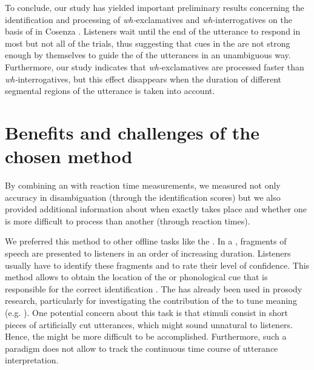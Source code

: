 \documentclass[output=paper]{langsci/langscibook}
\begin{document}
To conclude, our study has yielded important preliminary results concerning the identification and processing of \textit{wh-}exclamatives and \textit{wh-}interrogatives on the basis of  in Cosenza . Listeners wait until the end of the utterance to respond in most but not all of the trials, thus suggesting that  cues in the  are not strong enough by themselves to guide the  of the utterances in an unambiguous way. Furthermore, our study indicates that \textit{wh-}exclamatives are processed faster than \textit{wh-}interrogatives, but this effect disappears when the duration of different segmental regions of the utterance is taken into account.

\section{Benefits and challenges of the chosen method}
\label{sec:kel:7}

By combining an  with reaction time measurements, we measured not only accuracy in  disambiguation (through the identification scores) but we also provided additional information about when exactly  takes place and whether one  is more difficult to process than another (through reaction times).

We preferred this method to other offline tasks like the . In a , fragments of speech are presented to listeners in an order of increasing duration. Listeners usually have to identify these fragments and to rate their level of confidence. This method allows to obtain the location of the  or phonological cue that is responsible for the correct identification \citep{Prieto.2012}. The  has already been used in prosody research, particularly for investigating the contribution of the  to tune meaning (e.g. \citealt{Petrone2008,Petrone.2011,Sorianello2012,Prieto.2012}). One potential concern about this task is that stimuli consist in short pieces of artificially cut utterances, which might sound unnatural to listeners. Hence, the  might be more difficult to be accomplished. Furthermore, such a paradigm does not allow to track the continuous time course of utterance interpretation.
\end{document}
